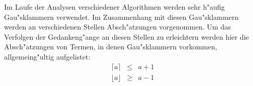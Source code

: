 Im \label{PageGaussklammern}
Laufe der Analysen verschiedener Algorithmen werden sehr h"aufig 
Gau"sklammern verwendet. Im Zusammenhang mit diesen Gau"sklammern werden
an verschiedenen Stellen Absch"atzungen vorgenommen. Um das Verfolgen
der Gedankeng"ange an diesen Stellen zu erleichtern werden hier die 
Absch"atzungen von Termen, in denen Gau"sklammern vorkommen, 
allgemeing"ultig aufgelistet:
\begin{eqnarray*}
   \lceil a \rceil & \leq & a + 1
\\ \lfloor a \rfloor & \geq & a - 1 
\end{eqnarray*}

